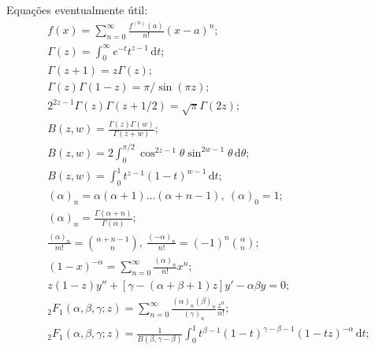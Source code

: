 \documentclass[a4paper,12pt, leqno, answers]{exam}
\begin{document}
\thispagestyle{empty}

\newpage
\setcounter{page}{1}
Equa\c{c}\~{o}es eventualmente útil:
\begin{align}
    & f(x) = \sum_{n = 0}^\infty \frac{f^{(n)}(a)}{n!} (x - a)^n; \tag{ST} \label{eq:ser_taylor} \\
    & \Gamma(z) = \int_0^\infty e^{-t} t^{z - 1} \,\mathrm{d}t; \tag{GE} \label{eq:gamma_euler} \\
    & \Gamma(z + 1) = z \Gamma(z); \label{eq:gamma_rel} \\
    & \Gamma(z) \Gamma(1 - z) = \pi / \sin(\pi z); \label{eq:gamma_sin} \\
    & 2^{2 z - 1} \Gamma(z) \Gamma(z + 1/2) = \sqrt{\pi} \Gamma(2 z); \label{eq:gamma_dup_legendre} \\
    & B(z, w) = \frac{\Gamma(z) \Gamma(w)}{\Gamma(z + w)}; \tag{BG} \label{eq:beta} \\
    & B(z, w) = 2 \int_0^{\pi / 2} \cos^{2z - 1} \theta \sin^{2w - 1} \theta \,\mathrm{d}\theta; \tag{BT} \label{eq:beta_trig} \\
    & B(z, w) = \int_0^1 t^{z - 1} (1 - t)^{w - 1} \,\mathrm{d}t; \tag{BI} \label{eq:beta_int} \\
    & (\alpha)_n = \alpha (\alpha + 1) \ldots (\alpha + n - 1), \ (\alpha)_0 = 1; \tag{SP} \label{eq:sim_poch} \\
    & (\alpha)_n = \frac{\Gamma(\alpha + n)}{\Gamma(\alpha)}; \label{eq:sim_poch_gamma} \\
    & \frac{(\alpha)_n}{m!} = \binom{\alpha + n - 1}{n}, \ \frac{(-\alpha)_n}{n!} = (-1)^n \binom{\alpha}{n}; \label{eq:sim_poch_binom} \\
    & (1 - x)^{-\alpha} = \sum_{n = 0}^\infty \frac{(\alpha)_n}{n!} x^n; \label{eq:newton_binom_with_poch} \\
    & z(1 - z)y'' + \left[ \gamma - (\alpha + \beta + 1) z \right] y' - \alpha \beta y = 0; \tag{EH} \label{eq:hiperg} \\
    & {}_2F_1(\alpha, \beta, \gamma; z) = \sum_{n = 0}^\infty \frac{(\alpha)_n (\beta)_n}{(\gamma)_n} \frac{z^n}{n!}; \tag{SH} \label{eq:ser_hiperg} \\
    & {}_2F_1(\alpha, \beta, \gamma; z) = \frac{1}{B(\beta, \gamma - \beta)} \int_0^1 t^{\beta - 1} (1- t)^{\gamma - \beta - 1} (1 - tz)^{-\alpha} \,\mathrm{d}t; \label{eq:hiperg_int} \\

\end{align}
\end{document}
